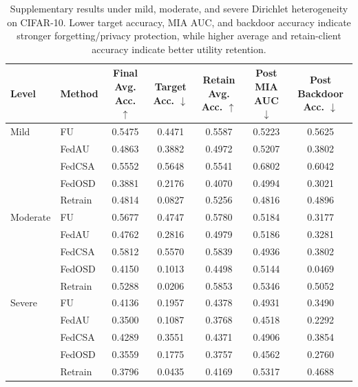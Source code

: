 \begin{table}[t]
\centering
\caption{Supplementary results under mild, moderate, and severe Dirichlet heterogeneity on CIFAR-10. Lower target accuracy, MIA AUC, and backdoor accuracy indicate stronger forgetting/privacy protection, while higher average and retain-client accuracy indicate better utility retention.}
\label{tab:heterogeneity_results}
\begin{tabular}{llccccc}
\toprule
Level & Method & Final Avg. Acc. $\uparrow$ & Target Acc. $\downarrow$ & Retain Avg. Acc. $\uparrow$ & Post MIA AUC $\downarrow$ & Post Backdoor Acc. $\downarrow$ \\
\midrule
Mild & FU & 0.5475 & 0.4471 & 0.5587 & 0.5223 & 0.5625 \\
 & FedAU & 0.4863 & 0.3882 & 0.4972 & 0.5207 & 0.3802 \\
 & FedCSA & 0.5552 & 0.5648 & 0.5541 & 0.6802 & 0.6042 \\
 & FedOSD & 0.3881 & 0.2176 & 0.4070 & 0.4994 & 0.3021 \\
 & Retrain & 0.4814 & 0.0827 & 0.5256 & 0.4816 & 0.4896 \\
\midrule
Moderate & FU & 0.5677 & 0.4747 & 0.5780 & 0.5184 & 0.3177 \\
 & FedAU & 0.4762 & 0.2816 & 0.4979 & 0.5186 & 0.3281 \\
 & FedCSA & 0.5812 & 0.5570 & 0.5839 & 0.4936 & 0.3802 \\
 & FedOSD & 0.4150 & 0.1013 & 0.4498 & 0.5144 & 0.0469 \\
 & Retrain & 0.5288 & 0.0206 & 0.5853 & 0.5346 & 0.5052 \\
\midrule
Severe & FU & 0.4136 & 0.1957 & 0.4378 & 0.4931 & 0.3490 \\
 & FedAU & 0.3500 & 0.1087 & 0.3768 & 0.4518 & 0.2292 \\
 & FedCSA & 0.4289 & 0.3551 & 0.4371 & 0.4906 & 0.3854 \\
 & FedOSD & 0.3559 & 0.1775 & 0.3757 & 0.4562 & 0.2760 \\
 & Retrain & 0.3796 & 0.0435 & 0.4169 & 0.5317 & 0.4688 \\
\bottomrule
\end{tabular}
\end{table}